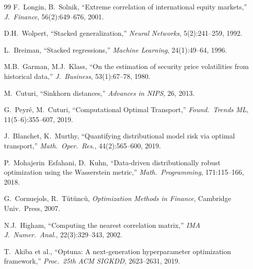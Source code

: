 \documentclass[10pt,twocolumn]{article}
\begin{document}
{\begin{thebibliography}{99}
F.~Longin, B.~Solnik, ``Extreme correlation of international equity
markets,''
\textit{J.~Finance}, 56(2):649--676, 2001.

D.H.~Wolpert, ``Stacked generalization,''
\textit{Neural Networks}, 5(2):241--259, 1992.

L.~Breiman, ``Stacked regressions,''
\textit{Machine Learning}, 24(1):49--64, 1996.

M.B.~Garman, M.J.~Klass, ``On the estimation of security price
volatilities from historical data,''
\textit{J.~Business}, 53(1):67--78, 1980.

M.~Cuturi, ``Sinkhorn distances,''
\textit{Advances in NIPS}, 26, 2013.

G.~Peyr\'e, M.~Cuturi, ``Computational Optimal Transport,''
\textit{Found.~Trends ML}, 11(5--6):355--607, 2019.

J.~Blanchet, K.~Murthy, ``Quantifying distributional model risk
via optimal transport,''
\textit{Math.~Oper.~Res.}, 44(2):565--600, 2019.

P.~Mohajerin~Esfahani, D.~Kuhn, ``Data-driven distributionally
robust optimization using the Wasserstein metric,''
\textit{Math.~Programming}, 171:115--166, 2018.

G.~Cornuejols, R.~T\"ut\"unc\"u,
\textit{Optimization Methods in Finance}, Cambridge Univ.~Press, 2007.

N.J.~Higham, ``Computing the nearest correlation matrix,''
\textit{IMA J.~Numer.~Anal.}, 22(3):329--343, 2002.

T.~Akiba et al., ``Optuna: A next-generation hyperparameter
optimization framework,''
\textit{Proc.~25th ACM SIGKDD}, 2623--2631, 2019.

\end{thebibliography}
}
\end{document}
